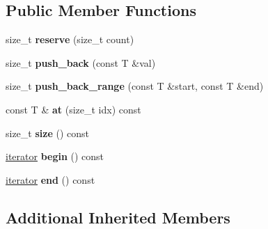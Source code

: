 \subsection*{Public Member Functions}
\begin{DoxyCompactItemize}
\item 
\mbox{\label{classdialog_1_1monolog_1_1monolog__exp2_a751a37541284171868faebad27f89b31}} 
size\+\_\+t {\bfseries reserve} (size\+\_\+t count)
\item 
\mbox{\label{classdialog_1_1monolog_1_1monolog__exp2_a991b3996e814455616c2bbb045b25e25}} 
size\+\_\+t {\bfseries push\+\_\+back} (const T \&val)
\item 
\mbox{\label{classdialog_1_1monolog_1_1monolog__exp2_a3ca865840be07349b8d9df1989ca5a46}} 
size\+\_\+t {\bfseries push\+\_\+back\+\_\+range} (const T \&start, const T \&end)
\item 
\mbox{\label{classdialog_1_1monolog_1_1monolog__exp2_a53e9b057e39b26a9d91c56ad8a907b09}} 
const T \& {\bfseries at} (size\+\_\+t idx) const
\item 
\mbox{\label{classdialog_1_1monolog_1_1monolog__exp2_a9564a4b217330641be63262c3f86843e}} 
size\+\_\+t {\bfseries size} () const
\item 
\mbox{\label{classdialog_1_1monolog_1_1monolog__exp2_a317fc0b23a841df31c0c4bfe0bbffdd7}} 
\hyperlink{classdialog_1_1monolog_1_1monolog__iterator}{iterator} {\bfseries begin} () const
\item 
\mbox{\label{classdialog_1_1monolog_1_1monolog__exp2_a20e4165ab6a3cf979a18b65e2fa0999a}} 
\hyperlink{classdialog_1_1monolog_1_1monolog__iterator}{iterator} {\bfseries end} () const
\end{DoxyCompactItemize}
\subsection*{Additional Inherited Members}


